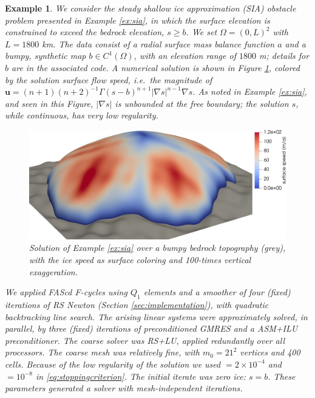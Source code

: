 \documentclass[letterpaper,final,12pt,reqno]{amsart}
\theoremstyle{cstyle}
\theoremstyle{cstyle*}
\theoremstyle{dstyle}
\newtheorem{example}[theorem]{Example}
\numberwithin{equation}{section}
\numberwithin{figure}{section}
\numberwithin{table}{section}
\numberwithin{theorem}{section}
\newcommand{\grad}{\nabla}
\newcommand{\pef}[1]{\todo[inline, color=red!20]{PF: #1}}
\begin{document}
\begin{example}   \label{ex:results:sia}
We consider the steady shallow ice approximation (SIA) obstacle problem presented in Example \ref{ex:sia}, in which the surface elevation is constrained to exceed the bedrock elevation, $s\ge b$.  We set $\Omega=(0,L)^2$ with $L=1800$ km.  The data consist of a radial surface mass balance function $a$ \cite[equation (5.122)]{GreveBlatter2009} and a bumpy, synthetic map $b\in C^1(\Omega)$, with an elevation range of $1800$ m; details for $b$ are in the associated code.  A numerical solution is shown in Figure \ref{fig:results:siascene}, colored by the solution surface flow speed, i.e.~the magnitude of $\mathbf{u} = (n+1)(n+2)^{-1} \Gamma (s-b)^{n+1} |\grad s|^{n-1} \grad s$.  As noted in Example \ref{ex:sia}, and seen in this Figure, $|\grad s|$ is unbounded at the free boundary; the solution $s$, while continuous, has very low regularity.

\begin{figure}[ht]
\begin{center}
\includegraphics[width=1.0\textwidth]{fixfigs/sialev8scene.png}
\end{center}
\caption{Solution of Example \ref{ex:sia} over a bumpy bedrock topography (grey), with the ice speed as surface coloring and 100-times vertical exaggeration.}
\label{fig:results:siascene}
\end{figure}

We applied FAScd F-cycles using $Q_1$ elements and a smoother of four (fixed) iterations of RS Newton (Section \ref{sec:implementation}), with quadratic backtracking line search.  The arising linear systems were approximately solved, in parallel, by three (fixed) iterations of preconditioned GMRES and a ASM+ILU preconditioner.  The coarse solver was RS+LU, applied redundantly over all processors.  The coarse mesh was relatively fine, with $m_0=21^2$ vertices and 400 cells.  Because of the low regularity of the solution we used  $= 2 \times 10^{-4}$ and  $= 10^{-8}$ in \eqref{eq:stoppingcriterion}.  The initial iterate was zero ice: $s=b$.  These parameters generated a solver with mesh-independent iterations.  


\end{example}
\end{document}
